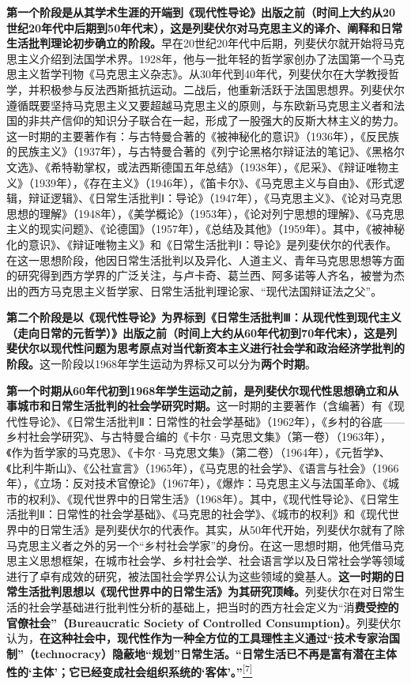\documentclass[UTF8, fontset = sourcesans, a4paper, oneside, zihao =
-4, scheme=chinese, no-math, space=true]{ctexbook}
\begin{document}
\textbf{第一个阶段是从其学术生涯的开端到《现代性导论》出版之前（时间上大约从20世纪20年代中后期到50年代末），这是列斐伏尔对马克思主义的译介、阐释和日常生活批判理论初步确立的阶段。}早在20世纪20年代中后期，列斐伏尔就开始将马克思主义介绍到法国学术界。1928年，他与一批年轻的哲学家创办了法国第一个马克思主义哲学刊物《马克思主义杂志》。从30年代到40年代，列斐伏尔在大学教授哲学，并积极参与反法西斯抵抗运动。二战后，他重新活跃于法国思想界。列斐伏尔遵循既要坚持马克思主义又要超越马克思主义的原则，与东欧新马克思主义者和法国的非共产信仰的知识分子联合在一起，形成了一股强大的反斯大林主义的势力。这一时期的主要著作有：与古特曼合著的《被神秘化的意识》（1936年），《反民族的民族主义》（1937年），与古特曼合著的《列宁论黑格尔辩证法的笔记》、《黑格尔文选》、《希特勒掌权，或法西斯德国五年总结》（1938年），《尼采》、《辩证唯物主义》（1939年），《存在主义》（1946年），《笛卡尔》、《马克思主义与自由》、《形式逻辑，辩证逻辑》、《日常生活批判Ⅰ：导论》（1947年），《马克思主义》、《论对马克思思想的理解》（1948年），《美学概论》（1953年），《论对列宁思想的理解》、《马克思主义的现实问题》、《论德国》（1957年），《总结及其他》（1959年）。其中，《被神秘化的意识》、《辩证唯物主义》和《日常生活批判Ⅰ：导论》是列斐伏尔的代表作。在这一思想阶段，他因日常生活批判以及异化、人道主义、青年马克思思想等方面的研究得到西方学界的广泛关注，与卢卡奇、葛兰西、阿多诺等人齐名，被誉为杰出的西方马克思主义哲学家、日常生活批判理论家、``现代法国辩证法之父''。

\textbf{第二个阶段是以《现代性导论》为界标到《日常生活批判Ⅲ：从现代性到现代主义（走向日常的元哲学）》出版之前（时间上大约从60年代初到70年代末），这是列斐伏尔以现代性问题为思考原点对当代新资本主义进行社会学和政治经济学批判的阶段。}这一阶段以1968年学生运动为界标又可以分为\textbf{两个时期}。

\textbf{第一个时期从60年代初到1968年学生运动之前，是列斐伏尔现代性思想确立和从事城市和日常生活批判的社会学研究时期。}这一时期的主要著作（含编著）有《现代性导论》、《日常生活批判Ⅱ：日常性的社会学基础》（1962年），《乡村的谷底------乡村社会学研究》、与古特曼合编的《卡尔·马克思文集》（第一卷）（1963年），《作为哲学家的马克思》、《卡尔·马克思文集》（第二卷）（1964年），《元哲学》、《比利牛斯山》、《公社宣言》（1965年），《马克思的社会学》、《语言与社会》（1966年），《立场：反对技术官僚论》（1967年），《爆炸：马克思主义与法国革命》、《城市的权利》、《现代世界中的日常生活》（1968年）。其中，《现代性导论》、《日常生活批判Ⅱ：日常性的社会学基础》、《马克思的社会学》、《城市的权利》和《现代世界中的日常生活》是列斐伏尔的代表作。其实，从50年代开始，列斐伏尔就有了除马克思主义者之外的另一个``乡村社会学家''的身份。在这一思想时期，他凭借马克思主义思想框架，在城市社会学、乡村社会学、社会语言学以及日常社会学等领域进行了卓有成效的研究，被法国社会学界公认为这些领域的奠基人。\textbf{这一时期的日常生活批判思想以《现代世界中的日常生活》为其研究顶峰。}列斐伏尔在对日常生活的社会学基础进行批判性分析的基础上，把当时的西方社会定义为``消\textbf{费受控的官僚社会''（Bureaucratic
Society of Controlled
Consumption）}。列斐伏尔认为，\textbf{在这种社会中，现代性作为一种全方位的工具理性主义通过``技术专家治国制''（technocracy）隐蔽地``规划''日常生活。``日常生活已不再是富有潜在主体性的`主体'；它已经变成社会组织系统的`客体'。''}\protect\hypertarget{part0004.htmlux5cux23w7}{}{}\protect\hyperlink{part0004.htmlux5cux23m7}{\textsuperscript{{[}7{]}}}
\end{document}
